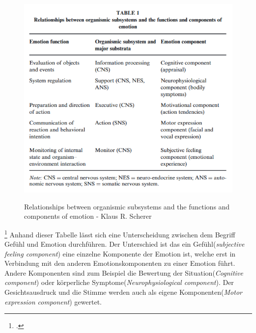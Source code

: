 \begin{figure}[h]
	\centering
	\includegraphics[width=15cm]{Bilder/Relationships-between-organismic-subsystems.png}
	\label{img:Emotion}
	\caption[Relationships between organismic subsystems and the functions and components of
	emotion - Klaus R. Scherer]{Relationships between organismic subsystems and the functions and components of
		emotion - Klaus R. Scherer\footnotemark}
\end{figure}%
\footcitetext[Vgl.][S.698 Table 1]{Kla05}
Anhand dieser Tabelle lässt sich eine Unterscheidung zwischen dem Begriff Gefühl und Emotion durchführen. Der Unterschied ist das ein Gefühl(\textit{subjective feeling component}) eine einzelne Komponente der Emotion ist, welche erst in Verbindung mit den anderen Emotionskomponenten zu einer Emotion führt. Andere Komponenten sind zum Beispiel die Bewertung der Situation(\textit{Cognitive component}) oder körperliche Symptome(\textit{Neurophysiological component}). Der Gesichtsausdruck und die Stimme werden auch als eigene Komponenten(\textit{Motor expression component}) gewertet. 

